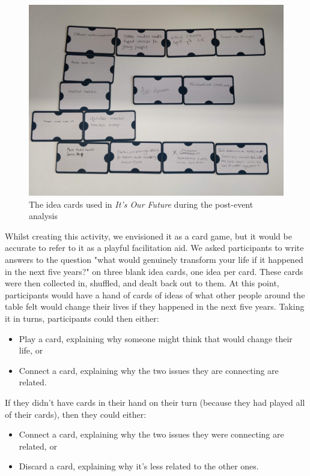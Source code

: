\begin{figure}
    \centering
    \includegraphics[width=1\linewidth]{Images/7/idea-cards.jpeg}
    \caption{The idea cards used in \textit{It's Our Future} during the post-event analysis}
    \label{fig:idea-cards}
\end{figure}

Whilst creating this activity, we envisioned it as a card game, but it would be accurate to refer to it as a playful facilitation aid. We asked participants to write answers to the question "what would genuinely transform your life if it happened in the next five years?" on three blank idea cards, one idea per card. These cards were then collected in, shuffled, and dealt back out to them. At this point, participants would have a hand of cards of ideas of what other people around the table felt would change their lives if they happened in the next five years. Taking it in turns, participants could then either:
\begin{itemize}
    \item Play a card, explaining why someone might think that would change their life, or
    \item Connect a card, explaining why the two issues they are connecting are related.
\end{itemize}
If they didn’t have cards in their hand on their turn (because they had played all of their cards), then they could either:

\begin{itemize}
    \item Connect a card, explaining why the two issues they were connecting are related, or
    \item Discard a card, explaining why it’s less related to the other ones.
\end{itemize}

